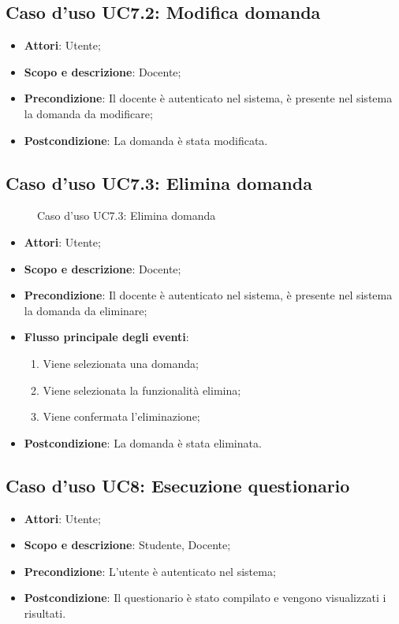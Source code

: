 \documentclass[12pt,a4paper]{article}
\begin{document}
\subsection{Caso d'uso UC7.2: Modifica domanda}\begin{itemize}
	\item \textbf{Attori}: Utente;
	\item \textbf{Scopo e descrizione}: Docente; 
	\item \textbf{Precondizione}: Il docente è autenticato nel sistema, è presente nel sistema la domanda da modificare;
	\item \textbf{Postcondizione}: La domanda è stata modificata.
\end{itemize}
\hypertarget{UC7.3}{}
\subsection{Caso d'uso UC7.3: Elimina domanda}
\begin{figure}[H]
	\centering

	\caption{Caso d'uso UC7.3: Elimina domanda}\label{fig:UC7.3} 
\end{figure}\begin{itemize}
\item \textbf{Attori}: Utente;
\item \textbf{Scopo e descrizione}: Docente; 
\item \textbf{Precondizione}: Il docente è autenticato nel sistema, è presente nel sistema la domanda da eliminare;

\item \textbf{Flusso principale degli eventi}:
\begin{enumerate}
	\item Viene selezionata una domanda;
	\item Viene selezionata la funzionalità elimina;
	\item Viene confermata l'eliminazione;
	
\end{enumerate}
\item \textbf{Postcondizione}: La domanda è stata eliminata.
\end{itemize}
\hypertarget{UC8}{}
\subsection{Caso d'uso UC8: Esecuzione questionario}\begin{itemize}
	\item \textbf{Attori}: Utente;
	\item \textbf{Scopo e descrizione}: Studente, Docente; 
	\item \textbf{Precondizione}: L'utente è autenticato nel sistema;
	\item \textbf{Postcondizione}: Il questionario è stato compilato e vengono visualizzati i risultati.
\end{itemize}
\hypertarget{UC8.1}{}
\end{document}
